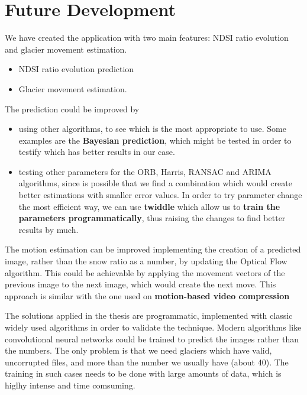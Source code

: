 \documentclass[12pt, a4paper]{report}
\begin{document}
	\newpage{}
	\section{Future Development}
	
	We have created the application with two main features: NDSI ratio evolution and glacier movement estimation.
	\begin{itemize}
		\item NDSI ratio evolution prediction
		\item Glacier movement estimation.
	\end{itemize} 
	
	The prediction could be improved by
	\begin{itemize}
		\item using other algorithms, to see which is the most appropriate to use. Some examples are the \textbf{Bayesian prediction}, which might be tested in order to testify which has better results in our case.
		\item testing other parameters for the ORB, Harris, RANSAC and ARIMA algorithms, since is possible that we find a combination which would create better estimations with smaller error values. In order to try parameter change the most efficient way, we can use \textbf{twiddle} \cite{twiddle} which allow us to \textbf{train the parameters programmatically}, thus raising the changes to find better results by much.
	\end{itemize} 
	
	The motion estimation can be improved implementing the creation of a predicted image, rather than the snow ratio as a number, by updating the Optical Flow algorithm. This could be achievable by applying the movement vectors of the previous image to the next image, which would create the next move. This approach is similar with the one used on \textbf{motion-based video compression} \cite{optical_flow_improve}
	
	The solutions applied in the thesis are programmatic, implemented with classic widely used algorithms in order to validate the technique. Modern algorithms like convolutional neural networks could be trained to predict the images rather than the numbers. The only problem is that we need glaciers which have valid, uncorrupted files, and more than the number we usually have (about 40). The training in such cases needs to be done with large amounts of data, which is higlhy intense and time comsuming. 
	
	\renewcommand{\bibname}{Bibliography}
	
\end{document}

